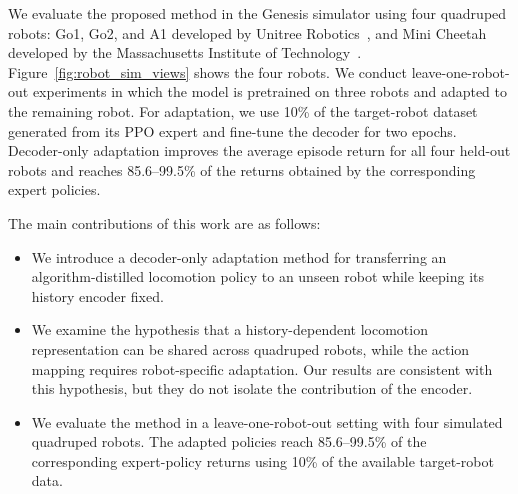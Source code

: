 \documentclass[runningheads]{llncs}
\begin{document}

We evaluate the proposed method in the Genesis simulator using four
quadruped robots: Go1, Go2, and A1 developed by Unitree
Robotics~\cite{unitree_updated}, and Mini Cheetah developed by the
Massachusetts Institute of Technology~\cite{8793865}.
Figure~\ref{fig:robot_sim_views} shows the four robots.
We conduct leave-one-robot-out experiments in which the model is pretrained on three robots and adapted to the remaining robot.
For adaptation, we use 10\% of the target-robot dataset generated from its PPO expert and fine-tune the decoder for two epochs.
Decoder-only adaptation improves the average
episode return for all four held-out robots and reaches 85.6--99.5\% of the returns obtained by the corresponding expert policies.

The main contributions of this work are as follows:
\begin{itemize}
\item We introduce a decoder-only adaptation method for transferring an algorithm-distilled locomotion policy to an unseen robot while keeping its history encoder fixed.
\item We examine the hypothesis that a history-dependent locomotion representation can be shared across quadruped robots, while the action mapping requires robot-specific adaptation. Our results are consistent with this hypothesis, but they do not isolate the contribution of the encoder.
\item We evaluate the method in a leave-one-robot-out setting with four simulated quadruped robots. The adapted policies reach 85.6--99.5\% of the corresponding expert-policy returns using 10\% of the available target-robot data.
\end{itemize}
\end{document}
